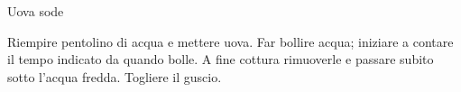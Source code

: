 \begin{recipe}[label=uova_sode]{Uova sode}
    \begin{header}

    \end{header}

    \begin{ingredients}
    \end{ingredients}

    \begin{preparation}
        \step Riempire pentolino di acqua e mettere uova.
        \step Far bollire acqua; iniziare a contare il tempo indicato da quando bolle.
        \step A fine cottura rimuoverle e passare subito sotto l'acqua fredda.
        \step Togliere il guscio.
    \end{preparation}
\end{recipe}
